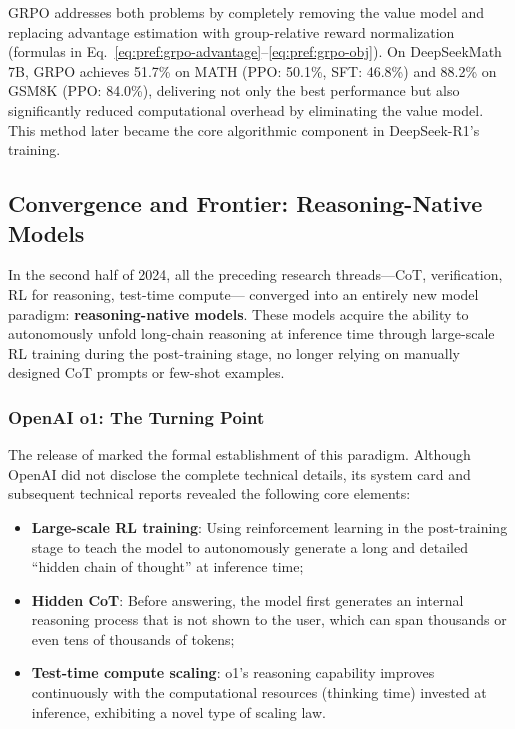 \noindent
GRPO addresses both problems by completely removing the value model
and replacing advantage estimation with group-relative reward normalization
(formulas in Eq.~\ref{eq:pref:grpo-advantage}--\ref{eq:pref:grpo-obj}).
On DeepSeekMath 7B, GRPO achieves 51.7\% on MATH (PPO: 50.1\%, SFT: 46.8\%)
and 88.2\% on GSM8K (PPO: 84.0\%),
delivering not only the best performance but also significantly reduced computational overhead by eliminating the value model.
This method later became the core algorithmic component in DeepSeek-R1's training.


\subsection{Convergence and Frontier: Reasoning-Native Models}
\label{sec:t4-convergence}

In the second half of 2024, all the preceding research threads---CoT, verification, RL for reasoning, test-time compute---
converged into an entirely new model paradigm: \textbf{reasoning-native models}.
These models acquire the ability to autonomously unfold long-chain reasoning at inference time
through large-scale RL training during the post-training stage,
no longer relying on manually designed CoT prompts or few-shot examples.

\subsubsection{OpenAI o1: The Turning Point}
\label{sec:t4-o1}

The release of  marked the formal establishment of this paradigm.
Although OpenAI did not disclose the complete technical details,
its system card and subsequent technical reports revealed the following core elements:

\begin{itemize}[leftmargin=2em]
  \item \textbf{Large-scale RL training}:
    Using reinforcement learning in the post-training stage to teach the model
    to autonomously generate a long and detailed ``hidden chain of thought'' at inference time;
  \item \textbf{Hidden CoT}:
    Before answering, the model first generates an internal reasoning process that is not shown to the user,
    which can span thousands or even tens of thousands of tokens;
  \item \textbf{Test-time compute scaling}:
    o1's reasoning capability improves continuously with the computational resources
    (thinking time) invested at inference, exhibiting a novel type of scaling law.
\end{itemize}

